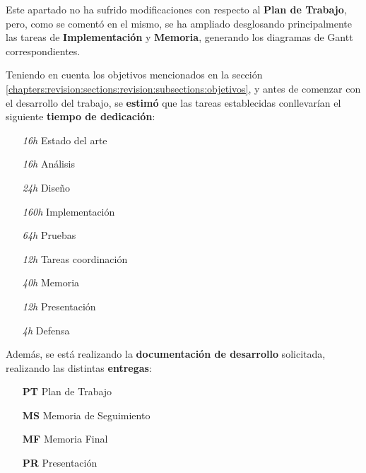 Este apartado no ha sufrido modificaciones con respecto al \textbf{Plan de Trabajo}, pero, como se comentó en el mismo, se ha ampliado desglosando principalmente las tareas de \textbf{Implementación} y \textbf{Memoria}, generando los diagramas de Gantt correspondientes.

Teniendo en cuenta los objetivos mencionados en la sección \ref{chapters:revision:sections:revision:subsections:objetivos}, y antes de comenzar con el desarrollo del trabajo, se \textbf{estimó} que las tareas establecidas conllevarían el siguiente \textbf{tiempo de dedicación}:

\begin{multicols}{3}[\vspace{-0.5em}]
    \begin{itemize}[leftmargin=2.5em, itemsep=0em]
        \item [\textit{16h}] Estado del arte
        \item [\textit{16h}] Análisis
        \item [\textit{24h}] Diseño
        \item [\textit{160h}] Implementación
        \item [\textit{64h}] Pruebas
        \item [\textit{12h}] Tareas coordinación
        \item [\textit{40h}] Memoria
        \item [\textit{12h}] Presentación
        \item [\textit{4h}] Defensa
    \end{itemize}
\end{multicols} \vspace{-1em}

Además, se está realizando la \textbf{documentación de desarrollo} solicitada, realizando las distintas \textbf{entregas}:

\begin{multicols}{2}[\vspace{-0.5em}]
    \begin{enumerate}[leftmargin=3em, itemsep=0em]
        \item [\textbf{PT}] Plan de Trabajo
        \item [\textbf{MS}] Memoria de Seguimiento
        \item [\textbf{MF}] Memoria Final
        \item [\textbf{PR}] Presentación
    \end{enumerate}
\end{multicols} \vspace{-1em}


